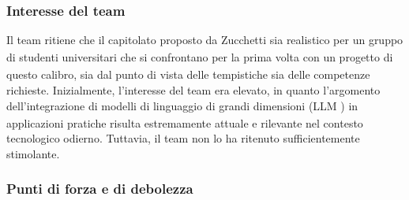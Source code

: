 \documentclass[a4paper,11pt]{article}
\begin{document}
\subsubsection{Interesse del team}
Il team ritiene che il capitolato\textsubscript{}
 proposto da Zucchetti sia realistico per un gruppo di studenti universitari che si confrontano per la prima volta con un progetto\textsubscript{}
 di questo calibro, sia dal punto di vista delle tempistiche sia delle competenze richieste. Inizialmente, l'interesse del team era elevato, in quanto l'argomento dell'integrazione di modelli di linguaggio di grandi dimensioni (LLM\textsubscript{}
) in applicazioni pratiche risulta estremamente attuale e rilevante nel contesto tecnologico odierno. Tuttavia, il team non lo ha ritenuto sufficientemente stimolante.

\subsubsection{Punti di forza e di debolezza}
\end{document}
